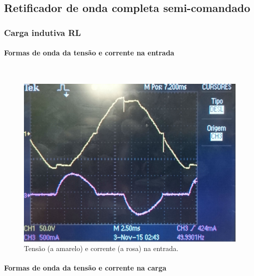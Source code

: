 \documentclass[a4paper,11pt]{article}
\numberwithin{equation}{section}
\begin{document}
\subsection{Retificador de onda completa semi-comandado}

\subsubsection{Carga indutiva RL}

\paragraph{Formas de onda da tensão e corrente na entrada} \mbox{}\

\begin{figure}[H]
	\centering
	\includegraphics[keepaspectratio=true, scale=0.12]{img/DSC_0190}
	\caption{Tensão (a amarelo) e corrente (a rosa) na entrada.}
	\label{fig:tcentradasemi}
	\vspace{-0.8em}
\end{figure}

\paragraph{Formas de onda da tensão e corrente na carga} \mbox{}\
\end{document}
